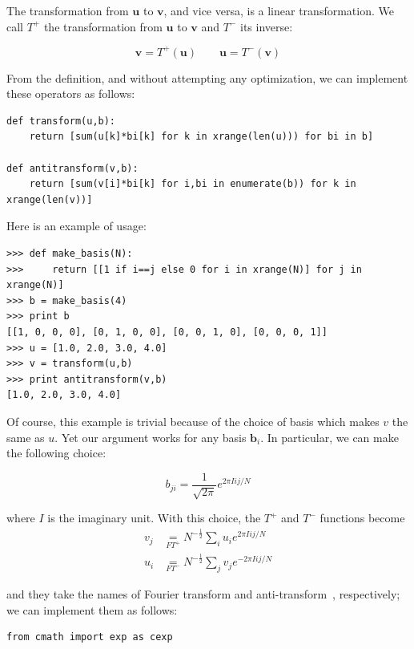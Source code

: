 \documentclass[justified,sixbynine]{tufte-book}
\def\stackunder#1#2{\mathrel{\mathop{#2}\limits_{#1}}}
\theoremstyle{plain}%
\theoremstyle{definition}
\theoremstyle{remark}
\begin{document}
\begin{fullwidth}
The transformation from $\mathbf{u}$ to $\mathbf{v}$, and vice versa, is a linear transformation. We call $T^+$ the transformation from $\mathbf{u}$ to $\mathbf{v}$  and $T^-$ its inverse:

\begin{equation}
\mathbf{v} = T^+(\mathbf{u}) \qquad
\mathbf{u} = T^-(\mathbf{v})
\end{equation}

From the definition, and without attempting any optimization, we can implement these operators as follows:

\begin{lstlisting}
def transform(u,b):
    return [sum(u[k]*bi[k] for k in xrange(len(u))) for bi in b]

def antitransform(v,b):
    return [sum(v[i]*bi[k] for i,bi in enumerate(b)) for k in xrange(len(v))]
\end{lstlisting}

Here is an example of usage:

\begin{lstlisting}
>>> def make_basis(N):
>>>     return [[1 if i==j else 0 for i in xrange(N)] for j in xrange(N)]
>>> b = make_basis(4)
>>> print b
[[1, 0, 0, 0], [0, 1, 0, 0], [0, 0, 1, 0], [0, 0, 0, 1]]
>>> u = [1.0, 2.0, 3.0, 4.0]
>>> v = transform(u,b)
>>> print antitransform(v,b)
[1.0, 2.0, 3.0, 4.0]
\end{lstlisting}

Of course, this example is trivial because of the choice of basis which makes $v$ the same as $u$. Yet our argument works for any basis $\mathbf{b}_i$. In particular, we can make the following choice:


\begin{equation}
b_{ji} = \frac{1}{\sqrt{2\pi}} e^{2\pi I ij/N}
\end{equation}

where $I$ is the imaginary unit. With this choice, the $T^+$ and $T^-$ functions become
\begin{align}
\label{fourierd1}
v_j &\stackunder{FT^+}{=} N^{-\frac12} \sum_i u_i e^{2\pi I ij/N} \\
\label{fourierd2}
u_i &\stackunder{FT^-}{=} N^{-\frac12} \sum_j v_j e^{-2\pi I ij/N}
\end{align}

and they take the names of Fourier transform and anti-transform~\cite{fourier}, respectively;
we can implement them as follows:

\begin{lstlisting}
from cmath import exp as cexp


\end{lstlisting}
\end{fullwidth}
\end{document}
